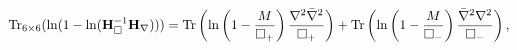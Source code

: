 \begin{equation}\label{h1}
{\rm Tr}_{6\times 6}(\ln (1- \ln ({\bf H}_{\Box}^{-1}{\bf H}_{\nabla})))=
{\rm Tr}\left(\ln \left(1-{M\over
\Box_{+}}\right){\nabla^{2}\bar{\nabla}^{2}\over\Box_{+}}\right)+
{\rm Tr}\left(\ln \left(1-{M\over
\Box_{-}}\right){\bar{\nabla}^{2}\nabla^{2}\over\Box_{-}}\right),
\end{equation}

